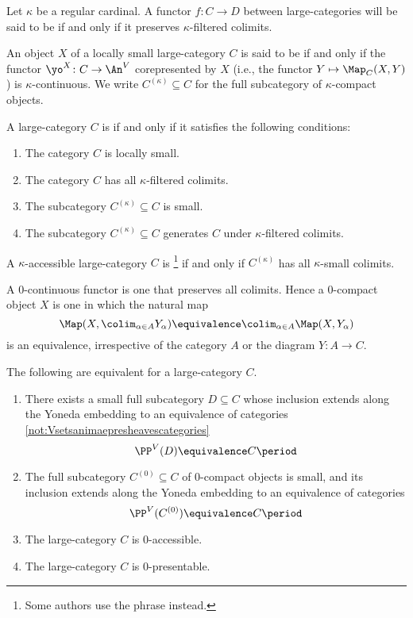 \begin{definition}
	Let $ \kappa $ be a regular cardinal.
	A functor $ f \colon C \to D $ between large-categories
	will be said to be 
	if and only if it preserves $ \kappa $-filtered colimits.
	
	An object $ X $ of a locally small large-category $ C $
	is said to be  if and only if
	the functor $ \yo^X \colon C \to \An^V$ corepresented by $ X $
	(i.e., the functor $ Y \mapsto \Map_C(X,Y) $)
	is $ \kappa $-continuous.
	We write $ C^{(\kappa)} \subseteq C $
	for the full subcategory of $ \kappa $-compact objects.

	A large-category $C$ is  if and only if
	it satisfies the following conditions:
	\begin{enumerate}
		\item The category $ C $
			is locally small.
		\item The category $ C $
			has all $ \kappa $-filtered colimits.
		\item The subcategory $ C^{(\kappa)} \subseteq C $ is small. 
		\item The subcategory $ C ^{(\kappa)} \subseteq C $ generates $ C $
			under $ \kappa $-filtered colimits.
	\end{enumerate}
	
	A $ \kappa $-accessible large-category $C$ is
	\footnote{Some authors use the phrase
		 instead.}
	if and only if $ C^{(\kappa)} $
	has all $ \kappa $-small colimits.
\end{definition}

\begin{eg}
	A $ 0 $-continuous functor is one that preserves all colimits.
	Hence a $ 0 $-compact object $ X $ is one in which the natural map 
	\[
		\Map(X, \colim_{\alpha \in A} Y_{\alpha}) \equivalence
		\colim_{\alpha \in A} \Map(X, Y_{\alpha})
	\]
	is an equivalence,
	irrespective of the category $ A $ or the diagram $ Y \colon A \to C $.

	The following are equivalent for a large-category $ C $.
	\begin{enumerate}
		\item There exists a small full subcategory $ D \subseteq C $ whose
			inclusion extends along the Yoneda embedding
			to an equivalence of categories
			\eqref{not:Vsetsanimaepresheavescategories}
			\[ \PP^V(D) \equivalence C \period \]
		\item The full subcategory $ C^{(0)} \subseteq C $ of $ 0 $-compact objects
			is small, and
			its inclusion extends along the Yoneda embedding
			to an equivalence of categories
			\[ \PP^V(C^{(0)}) \equivalence C \period \]
		\item The large-category $ C $ is $ 0 $-accessible.
		\item The large-category $ C $ is $ 0 $-presentable.
	\end{enumerate}
\end{eg}

